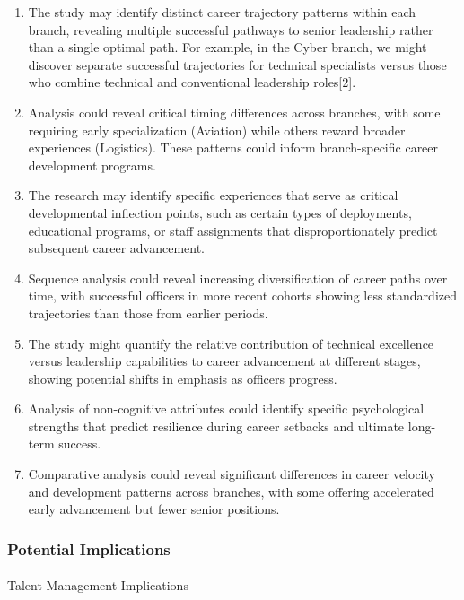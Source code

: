 \documentclass[
  letterpaper,
  DIV=11,
  numbers=noendperiod]{scrartcl}
\makeatletter
\let\oldparagraph\paragraph
\renewcommand{\paragraph}{
    \@ifstar
      \xxxParagraphStar
      \xxxParagraphNoStar
  }
\newcommand{\xxxParagraphStar}[1]{\oldparagraph*{#1}\mbox{}}
\newcommand{\xxxParagraphNoStar}[1]{\oldparagraph{#1}\mbox{}}
\makeatother
\begin{document}
\begin{enumerate}
\def\labelenumi{\arabic{enumi}.}
\item
  The study may identify distinct career trajectory patterns within each
  branch, revealing multiple successful pathways to senior leadership
  rather than a single optimal path. For example, in the Cyber branch,
  we might discover separate successful trajectories for technical
  specialists versus those who combine technical and conventional
  leadership roles{[}2{]}.
\item
  Analysis could reveal critical timing differences across branches,
  with some requiring early specialization (Aviation) while others
  reward broader experiences (Logistics). These patterns could inform
  branch-specific career development programs.
\item
  The research may identify specific experiences that serve as critical
  developmental inflection points, such as certain types of deployments,
  educational programs, or staff assignments that disproportionately
  predict subsequent career advancement.
\item
  Sequence analysis could reveal increasing diversification of career
  paths over time, with successful officers in more recent cohorts
  showing less standardized trajectories than those from earlier
  periods.
\item
  The study might quantify the relative contribution of technical
  excellence versus leadership capabilities to career advancement at
  different stages, showing potential shifts in emphasis as officers
  progress.
\item
  Analysis of non-cognitive attributes could identify specific
  psychological strengths that predict resilience during career setbacks
  and ultimate long-term success.
\item
  Comparative analysis could reveal significant differences in career
  velocity and development patterns across branches, with some offering
  accelerated early advancement but fewer senior positions.
\end{enumerate}

\subsubsection{Potential Implications}\label{potential-implications}

\paragraph{Talent Management
Implications}\label{talent-management-implications}
\end{document}

